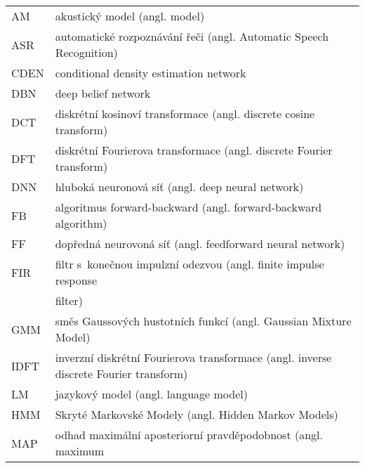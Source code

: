 \hspace{1.3cm}
\begin{longtable}{ll}

AM   & akustický model (angl.  model) \\
ASR  & automatické rozpoznávání řeči (angl. Automatic Speech Recognition) \\
CDEN & conditional density estimation network \\
DBN  & deep belief network \\
DCT  & diskrétní kosinoví transformace (angl. discrete cosine transform) \\
DFT  & diskrétní Fourierova transformace (angl. discrete Fourier transform) \\
DNN  & hluboká neuronová síť (angl. deep neural network) \\
FB   & algoritmus forward-backward (angl. forward-backward algorithm) \\
FF   & dopředná neurovoná síť (angl. feedforward neural network) \\
FIR  & filtr s~konečnou impulzní odezvou (angl. finite impulse response \\
     & filter) \\
GMM  & směs Gaussových hustotních funkcí (angl. Gaussian Mixture Model) \\
IDFT  & inverzní diskrétní Fourierova transformace (angl. inverse discrete Fourier transform) \\
LM   & jazykový model (angl. language model) \\
HMM  & Skryté Markovské Modely (angl. Hidden Markov Models) \\
MAP  & odhad maximální aposteriorní pravděpodobnost (angl. maximum \\

\end{longtable}
